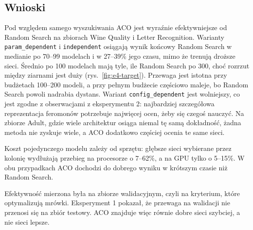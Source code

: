 \subsection{Wnioski}

Pod względem samego wyszukiwania ACO jest wyraźnie efektywniejsze od Random Search na
zbiorach Wine Quality i Letter Recognition. Warianty \texttt{param\_dependent}
i \texttt{independent} osiągają wynik końcowy Random Search w medianie po 70--99 modelach
i w 27--39\% jego czasu, mimo że trenują droższe sieci. Średnio po 100 modelach mają tyle,
ile Random Search po 300, choć rozrzut między ziarnami jest duży (rys.~\ref{fig:e4-target}).
Przewaga jest istotna przy budżetach 100--200 modeli, a przy pełnym budżecie częściowo maleje,
bo Random Search powoli nadrabia dystans. Wariant \texttt{config\_dependent} jest
wolniejszy, co jest zgodne z obserwacjami z eksperymentu 2: najbardziej szczegółowa
reprezentacja feromonów potrzebuje najwięcej ocen, żeby się czegoś nauczyć. Na zbiorze Adult,
gdzie wiele architektur osiąga niemal tę samą dokładność, żadna metoda nie zyskuje wiele,
a ACO dodatkowo częściej ocenia te same sieci.

Koszt pojedynczego modelu zależy od sprzętu: głębsze sieci wybierane przez kolonię wydłużają
przebieg na procesorze o 7--62\%, a na GPU tylko o 5--15\%. W obu przypadkach ACO dochodzi
do dobrego wyniku w krótszym czasie niż Random Search.

Efektywność mierzona była na zbiorze walidacyjnym, czyli na kryterium, które optymalizują
mrówki. Eksperyment 1 pokazał, że przewaga na walidacji nie przenosi się na zbiór testowy.
ACO znajduje więc równie dobre sieci szybciej, a nie sieci lepsze.
